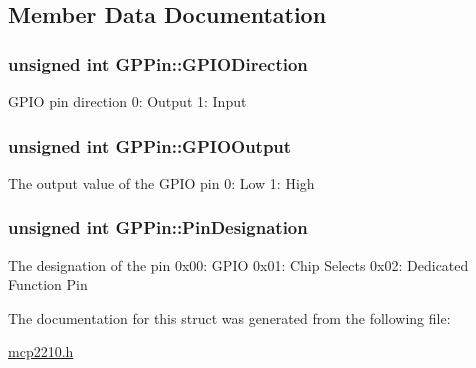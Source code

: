 \subsection{\-Member \-Data \-Documentation}
\hypertarget{struct_g_p_pin_a67735613380d11c71a1a447c7459bc6d}{
\subsubsection[{\-G\-P\-I\-O\-Direction}]{\setlength{\rightskip}{0pt plus 5cm}unsigned int {\bf \-G\-P\-Pin\-::\-G\-P\-I\-O\-Direction}}}\label{struct_g_p_pin_a67735613380d11c71a1a447c7459bc6d}
\-G\-P\-I\-O pin direction 0\-: \-Output 1\-: \-Input \hypertarget{struct_g_p_pin_a1fffec9bada958b64937f51655c569e4}{
\subsubsection[{\-G\-P\-I\-O\-Output}]{\setlength{\rightskip}{0pt plus 5cm}unsigned int {\bf \-G\-P\-Pin\-::\-G\-P\-I\-O\-Output}}}\label{struct_g_p_pin_a1fffec9bada958b64937f51655c569e4}
\-The output value of the \-G\-P\-I\-O pin 0\-: \-Low 1\-: \-High \hypertarget{struct_g_p_pin_a3d0225b44b50d426354e47851f246ab9}{
\subsubsection[{\-Pin\-Designation}]{\setlength{\rightskip}{0pt plus 5cm}unsigned int {\bf \-G\-P\-Pin\-::\-Pin\-Designation}}}\label{struct_g_p_pin_a3d0225b44b50d426354e47851f246ab9}
\-The designation of the pin 0x00\-: \-G\-P\-I\-O 0x01\-: \-Chip \-Selects 0x02\-: \-Dedicated \-Function \-Pin 

\-The documentation for this struct was generated from the following file\-:\begin{DoxyCompactItemize}
\item 
\hyperlink{mcp2210_8h}{mcp2210.\-h}\end{DoxyCompactItemize}

